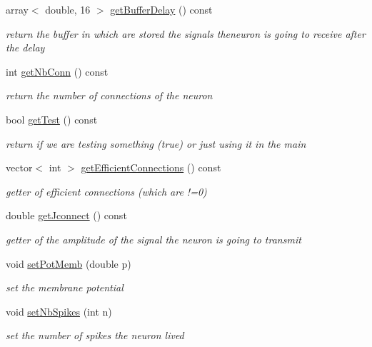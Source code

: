 \begin{DoxyCompactItemize}
array$<$ double, 16 $>$ \hyperlink{classNeuron_a594f0e955a344a5b0cf1c27d1ea49963}{get\-Buffer\-Delay} () const 
\begin{DoxyCompactList}\small\item\em return the buffer in which are stored the signals theneuron is going to receive after the delay \end{DoxyCompactList}\item 
int \hyperlink{classNeuron_a864fc4c8fe9c2e303f6617553c729661}{get\-Nb\-Conn} () const 
\begin{DoxyCompactList}\small\item\em return the number of connections of the neuron \end{DoxyCompactList}\item 
bool \hyperlink{classNeuron_ade02b2e51d19c01b2dbe032ecd8de8d1}{get\-Test} () const 
\begin{DoxyCompactList}\small\item\em return if we are testing something (true) or just using it in the main \end{DoxyCompactList}\item 
vector$<$ int $>$ \hyperlink{classNeuron_a2155b6a389fd82a10c5b48519af14e64}{get\-Efficient\-Connections} () const 
\begin{DoxyCompactList}\small\item\em getter of efficient connections (which are !=0) \end{DoxyCompactList}\item 
double \hyperlink{classNeuron_a33a5eec13c1431b19cd4c9fc1bb02c0d}{get\-Jconnect} () const 
\begin{DoxyCompactList}\small\item\em getter of the amplitude of the signal the neuron is going to transmit \end{DoxyCompactList}\item 
void \hyperlink{classNeuron_a39a86229bfac42c2e9ebbb91dd8655e8}{set\-Pot\-Memb} (double p)
\begin{DoxyCompactList}\small\item\em set the membrane potential \end{DoxyCompactList}\item 
void \hyperlink{classNeuron_afd39ff97179ef4f074653f024b69b610}{set\-Nb\-Spikes} (int n)
\begin{DoxyCompactList}\small\item\em set the number of spikes the neuron lived \end{DoxyCompactList}\item 

\end{DoxyCompactItemize}
